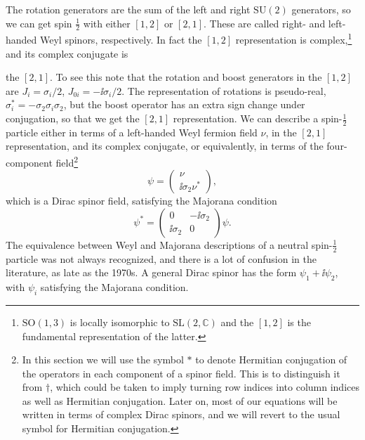 
The rotation generators are the sum of the left and right $\mathrm{SU}(2)$ generators, so we can
get spin $\frac12$ with either $[1,2]$ or $[2,1]$. These are called right- and left-handed Weyl spinors,
respectively. In fact the $[1,2]$ representation is complex,\footnote[3]{$\mathrm{SO}(1,3)$ is locally isomorphic to $\mathrm{SL}(2,\mathbb C)$ and the $[1,2]$ is the fundamental representation of the latter.} and its complex conjugate is

the $[2,1]$. To see this note that the rotation and boost generators in the $[1,2]$ are $J_i=
\sigma_i/2$, $J_{0i}=-\ii\sigma_i/2$. The representation of rotations is pseudo-real, $\sigma_i^*=-\sigma_2\sigma_i\sigma_2$, but
the boost operator has an extra sign change under conjugation, so that we get the $[2,1]$
representation. We can describe a spin-$\frac12$ particle either in terms of a left-handed Weyl
fermion field $\nu$, in the $[2,1]$ representation, and its complex conjugate, or equivalently,
in terms of the four-component field\footnote[4]{In this section we will use the symbol $*$ to denote Hermitian conjugation of the operators in each component of a spinor field. This is to distinguish it from $\dagger$, which could be taken to imply turning row indices into column indices as well as Hermitian conjugation. Later on, most of our equations will be written in terms of complex Dirac spinors, and we will revert to the usual symbol for Hermitian conjugation.}
\begin{equation*}
  \psi=\begin{pmatrix}\nu\\ \ii\sigma_2\nu^*\end{pmatrix},
\end{equation*}
which is a Dirac spinor field, satisfying the Majorana condition
\begin{equation*}
  \psi^*=\begin{pmatrix}0&-\ii\sigma_2\\ \ii\sigma_2&0\end{pmatrix}\psi.
\end{equation*}
The equivalence between Weyl and Majorana descriptions of a neutral spin-$\frac12$ particle
was not always recognized, and there is a lot of confusion in the literature, as late as the
1970s. A general Dirac spinor has the form $\psi_1+\ii\psi_2$, with $\psi_i$ satisfying the Majorana
condition.

